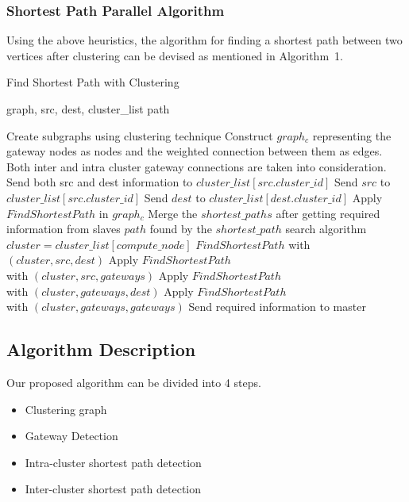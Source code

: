 \subsubsection{Shortest Path Parallel Algorithm}
Using the above heuristics, the algorithm for finding a shortest
path between two vertices after clustering can be devised
as mentioned in Algorithm~1.

\begin{algorithm}[!htb]
    \label{alg:shortest_path_with_clustering}
    \caption{Find Shortest Path with Clustering}
    \begin{algorithmic}[1]
    \renewcommand{\algorithmicrequire}{\textbf{Input:}}
    \renewcommand{\algorithmicensure}{\textbf{Output:}}
    \REQUIRE graph, src, dest, cluster\_list
    \ENSURE  path

	\STATE Create subgraphs using clustering technique
	\STATE Construct $graph_c$ representing the gateway nodes as nodes and the weighted connection between them as edges. Both inter and intra cluster gateway connections are taken into consideration.
			\STATE Send both src and dest information to $cluster\_list[src.cluster\_id]$
		\ELSE
			\STATE Send $src$ to $cluster\_list[src.cluster\_id]$
			\STATE Send $dest$ to $cluster\_list[dest.cluster\_id]$
			\STATE Apply $Find Shortest Path$ in $graph_c$
			\STATE Merge the $shortest\_paths$ after getting required information from slaves
			\RETURN $path$ found by the $shortest\_path$ search algorithm
		\ENDIF
		\STATE $cluster = cluster\_list[compute\_node]$
    		\STATE $Find Shortest Path$ with $(cluster, src, dest)$
   		\ELSE
    			\STATE Apply $Find Shortest Path$\\ with $(cluster, src, gateways)$
    			\STATE Apply $Find Shortest Path$\\ with $(cluster, gateways, dest)$
    		\ELSE
    			\STATE Apply $Find Shortest Path$\\ with $(cluster, gateways, gateways)$
    		\ENDIF
   		\ENDIF
    	\STATE Send required information to master
    \ENDIF
    \end{algorithmic}
\end{algorithm}

\subsection{Algorithm Description}
Our proposed algorithm can be divided into 4 steps.
\begin{itemize}
    \item{Clustering graph}
    \item{Gateway Detection}
    \item{Intra-cluster shortest path detection}
    \item{Inter-cluster shortest path detection}
\end{itemize}
